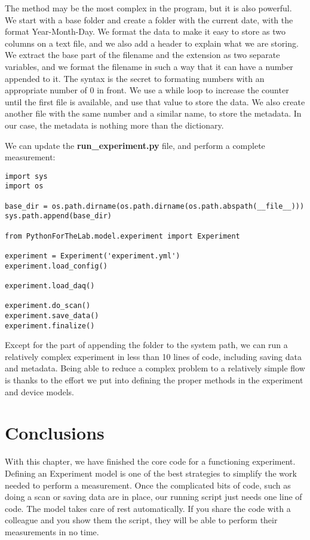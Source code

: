 The  method may be the most complex in the program, but it is also powerful. We start with a base folder and create a folder with the current date, with the format Year-Month-Day. We format the data to make it easy to store as two columns on a text file, and we also add a header to explain what we are storing. We extract the base part of the filename and the extension as two separate variables, and we format the filename in such a way that it can have a number appended to it. The syntax  is the secret to formating numbers with an appropriate number of $0$ in front. We use a while loop to increase the counter until the first file is available, and use that value to store the data. We also create another file with the same number and a similar name, to store the metadata. In our case, the metadata is nothing more than the  dictionary.


We can update the \textbf{run\_experiment.py} file, and perform a complete measurement:

\begin{verbatim}
import sys
import os

base_dir = os.path.dirname(os.path.dirname(os.path.abspath(__file__)))
sys.path.append(base_dir)

from PythonForTheLab.model.experiment import Experiment

experiment = Experiment('experiment.yml')
experiment.load_config()

experiment.load_daq()

experiment.do_scan()
experiment.save_data()
experiment.finalize()
\end{verbatim}

Except for the part of appending the folder to the system path, we can run a relatively complex experiment in less than 10 lines of code, including saving data and metadata. Being able to reduce a complex problem to a relatively simple flow is thanks to the effort we put into defining the proper methods in the experiment and device models.

\section{Conclusions}\label{sec:experiment-model-conclusions}
With this chapter, we have finished the core code for a functioning experiment. Defining an Experiment model is one of the best strategies to simplify the work needed to perform a measurement. Once the complicated bits of code, such as doing a scan or saving data are in place, our running script just needs one line of code. The model takes care of rest automatically. If you share the code with a colleague and you show them the  script, they will be able to perform their measurements in no time.

